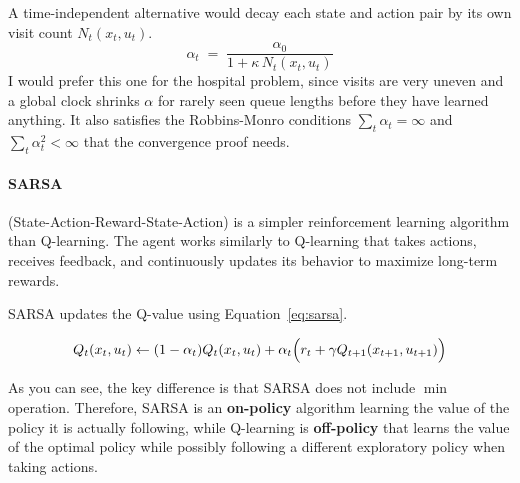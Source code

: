 \documentclass[11pt, letter, answers]{exam}
\begin{document}
\begin{enumerate}[label=(\alph*), resume]
\begin{answerBox}[height=3in]
A time-independent alternative would decay each state and action pair by its own visit count $N_t(x_t,u_t)$.
\[ \alpha_t \;=\; \frac{\alpha_0}{1 + \kappa\, N_t(x_t, u_t)} \]
I would prefer this one for the hospital problem, since visits are very uneven and a global clock shrinks $\alpha$ for rarely seen queue lengths before they have learned anything. It also satisfies the Robbins-Monro conditions $\sum_t \alpha_t = \infty$ and $\sum_t \alpha_t^2 < \infty$ that the convergence proof needs.
\end{answerBox}



\end{enumerate}


\paragraph{SARSA} (State-Action-Reward-State-Action) is a simpler reinforcement learning algorithm than Q-learning. The agent works similarly to Q-learning that takes actions, receives feedback, and continuously updates its behavior to maximize long-term rewards. 

SARSA updates the Q-value using Equation~\ref{eq:sarsa}. 

\begin{equation}
    Q_t(x_t, u_t) \leftarrow (1-\alpha_t) Q_t(x_t,u_t) + \alpha_t \Bigl( r_t + \gamma Q_{t+1}(x_{t+1}, u_{t+1})\Bigr)
    \label{eq:sarsa}
\end{equation}

As you can see, the key difference is that SARSA does not include $\min$ operation. Therefore, SARSA is an \textbf{on-policy} algorithm learning the value of the policy it is actually following, while Q-learning is \textbf{off-policy} that learns the value of the optimal policy while possibly following a different exploratory policy when taking actions.
\end{document}
